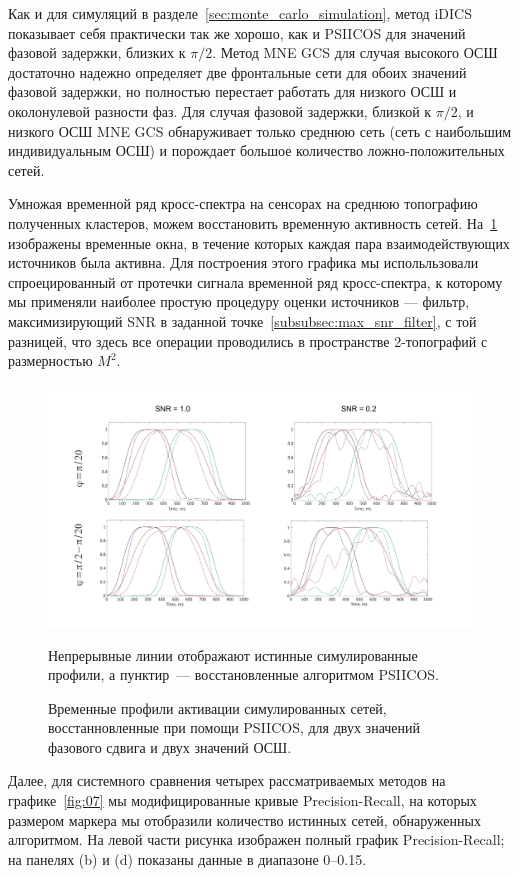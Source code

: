 Как и для симуляций в разделе~\ref{sec:monte_carlo_simulation}, метод iDICS показывает себя
практически так же хорошо, как и PSIICOS для значений фазовой задержки, близких к $\pi/2$.
Метод MNE GCS для случая высокого ОСШ достаточно надежно определяет две фронтальные сети для
обоих значений фазовой задержки, но полностью перестает работать для низкого ОСШ и
околонулевой разности фаз. Для случая фазовой задержки, близкой к $\pi/2$, и низкого ОСШ
MNE GCS обнаруживает только среднюю сеть (сеть с наибольшим индивидуальным ОСШ) и
порождает большое количество ложно-положительных сетей.

Умножая временной ряд кросс-спектра на сенсорах на среднюю топографию
полученных кластеров, можем восстановить временную активность сетей.
На~\ref{fig:06} изображены временные окна, в течение которых каждая пара
взаимодействующих источников была активна.  Для построения этого графика мы
испольльзовали спроецированный от протечки сигнала временной ряд кросс-спектра,
к которому мы применяли наиболее простую процедуру оценки источников ---
фильтр, максимизирующий SNR в заданной точке~\ref{subsubsec:max_snr_filter}, с
той разницей, что здесь все операции проводились в пространстве 2-топографий с
размерностью $M^2$.

\begin{figure}[!ht]
    \includegraphics[width=1\textwidth]{../images/psiicos_paper/Figure6_hr.jpg}
    \caption{Временные профили активации симулированных сетей, восстанновленные при помощи PSIICOS, для двух
        значений фазового сдвига и двух значений ОСШ.}\label{fig:06} %
        Непрерывные линии отображают истинные симулированные профили, а
        пунктир~--- восстановленные алгоритмом PSIICOS.\@
\end{figure}%

Далее, для системного сравнения четырех рассматриваемых методов на графике~\ref{fig:07}
мы модифицированные кривые Precision-Recall, на которых размером маркера мы отобразили
количество истинных сетей, обнаруженных алгоритмом. На левой части рисунка изображен
полный график Precision-Recall; на панелях (b) и (d) показаны данные в диапазоне 0--0.15.

